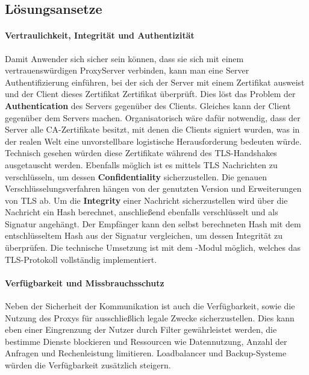 \documentclass[12pt, a4paper]{scrartcl}
\begin{document}
\subsection{Lösungsansetze}
\paragraph{Vertraulichkeit, Integrität und Authentizität}
Damit Anwender sich sicher sein können, dass sie sich mit einem vertrauenswürdigen ProxyServer verbinden, kann man eine Server Authentifizierung einführen, bei der sich der Server mit einem Zertifikat ausweist und der Client dieses Zertifikat Zertifikat überprüft. Dies löst das Problem der \textbf{Authentication} des Servers gegenüber des Clients. Gleiches kann der Client gegenüber dem Servers machen. Organisatorisch wäre dafür notwendig, dass der Server alle CA-Zertifikate besitzt, mit denen die Clients signiert wurden, was in der realen Welt eine unvorstellbare logistische Herausforderung bedeuten würde.\newline
Technisch gesehen würden diese Zertifikate während des \ac{TLS}-Handshakes ausgetauscht werden. Ebenfalls möglich ist es mittels \ac{TLS} Nachrichten zu verschlüsseln, um dessen \textbf{Confidentiality} sicherzustellen. Die genauen Verschlüsselungsverfahren hängen von der genutzten Version und Erweiterungen von \ac{TLS} ab.\newline
Um die \textbf{Integrity} einer Nachricht sicherzustellen wird über die Nachricht ein Hash berechnet, anschließend ebenfalls verschlüsselt und als Signatur angehängt. Der Empfänger kann den selbst berechneten Hash mit dem entschlüsseltem Hash aus der Signatur vergleichen, um dessen Integrität zu überprüfen.\newline
Die technische Umsetzung ist mit dem -Modul möglich, welches das \ac{TLS}-Protokoll vollständig implementiert.

\paragraph{Verfügbarkeit und Missbrauchsschutz}
Neben der Sicherheit der Kommunikation ist auch die Verfügbarkeit, sowie die Nutzung des Proxys für ausschließlich legale Zwecke sicherzustellen. Dies kann eben einer Eingrenzung der Nutzer durch Filter gewährleistet werden, die bestimme Dienste blockieren und Ressourcen wie Datennutzung, Anzahl der Anfragen und Rechenleistung limitieren. Loadbalancer und Backup-Systeme würden die Verfügbarkeit zusätzlich steigern.
\end{document}
